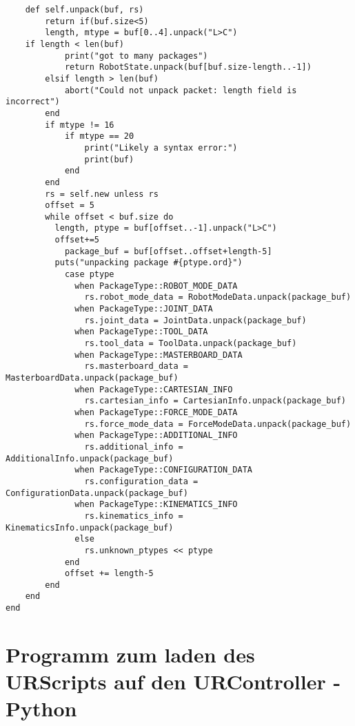 \documentclass[
a4paper,
12pt,
oneside,
headsepline,		%
footsepline,		%
]{scrbook}
\begin{document}
\begin{lstlisting}
    def self.unpack(buf, rs)
        return if(buf.size<5)
        length, mtype = buf[0..4].unpack("L>C")
    if length < len(buf)
            print("got to many packages")
            return RobotState.unpack(buf[buf.size-length..-1])
        elsif length > len(buf)
            abort("Could not unpack packet: length field is incorrect")
        end
        if mtype != 16
            if mtype == 20
                print("Likely a syntax error:")
                print(buf)
            end
        end
        rs = self.new unless rs
        offset = 5
        while offset < buf.size do
          length, ptype = buf[offset..-1].unpack("L>C")
          offset+=5
            package_buf = buf[offset..offset+length-5]
          puts("unpacking package #{ptype.ord}")
            case ptype
              when PackageType::ROBOT_MODE_DATA
                rs.robot_mode_data = RobotModeData.unpack(package_buf)
              when PackageType::JOINT_DATA
                rs.joint_data = JointData.unpack(package_buf)
              when PackageType::TOOL_DATA
                rs.tool_data = ToolData.unpack(package_buf)
              when PackageType::MASTERBOARD_DATA
                rs.masterboard_data = MasterboardData.unpack(package_buf)
              when PackageType::CARTESIAN_INFO
                rs.cartesian_info = CartesianInfo.unpack(package_buf)
              when PackageType::FORCE_MODE_DATA
                rs.force_mode_data = ForceModeData.unpack(package_buf)
              when PackageType::ADDITIONAL_INFO
                rs.additional_info = AdditionalInfo.unpack(package_buf)
              when PackageType::CONFIGURATION_DATA
                rs.configuration_data = ConfigurationData.unpack(package_buf)
              when PackageType::KINEMATICS_INFO
                rs.kinematics_info = KinematicsInfo.unpack(package_buf)
              else
                rs.unknown_ptypes << ptype
            end
            offset += length-5
        end
    end
end
\end{lstlisting}

\chapter{Programm zum laden des URScripts auf den URController - Python}

\begin{lstlisting}
\end{lstlisting}
\end{document}
